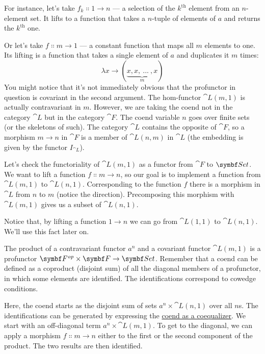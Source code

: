 \noindent
For instance, let's take $f_k \Colon 1 \to n$ --- a
selection of the $k^\text{th}$ element from an $n$-element set. It lifts to
a function that takes a $n$-tuple of elements of $a$ and returns
the $k^\text{th}$ one.

Or let's take $f \Colon m \to 1$ --- a constant
function that maps all $m$ elements to one. Its lifting is a function that
takes a single element of $a$ and duplicates it $m$ times:
\[\lambda{}x \to (\underbrace{x, x,\ ...\ , x}_{m})\]
You might notice that it's not immediately obvious that the profunctor
in question is covariant in the second argument. The hom-functor
$\cat{L}(m, 1)$ is actually contravariant in $m$. However, we
are taking the coend not in the category $\cat{L}$ but in the category
$\cat{F}$. The coend variable $n$ goes over finite sets (or the
skeletons of such). The category $\cat{L}$ contains the opposite of
$\cat{F}$, so a morphism $m \to n$ in $\cat{F}$
is a member of $\cat{L}(n, m)$ in $\cat{L}$ (the embedding is given
by the functor $I_{\cat{L}}$).

Let's check the functoriality of $\cat{L}(m, 1)$ as a functor from
$\cat{F}$ to $\Set$. We want to lift a function
$f \Colon m \to n$, so our goal is to implement a
function from $\cat{L}(m, 1)$ to $\cat{L}(n, 1)$. Corresponding to
the function $f$ there is a morphism in $\cat{L}$ from
$n$ to $m$ (notice the direction). Precomposing this
morphism with $\cat{L}(m, 1)$ gives us a subset of
$\cat{L}(n, 1)$.

\begin{figure}[H]
  \centering
\end{figure}

\noindent
Notice that, by lifting a function $1 \to n$ we can go
from $\cat{L}(1, 1)$ to $\cat{L}(n, 1)$. We'll use this fact later
on.

The product of a contravariant functor $a^n$ and a covariant
functor $\cat{L}(m, 1)$ is a profunctor
$\Fop \times \cat{F} \to \Set$. Remember that a coend can be defined
as a coproduct (disjoint sum) of all the diagonal members of a
profunctor, in which some elements are identified. The identifications
correspond to cowedge conditions.

Here, the coend starts as the disjoint sum of sets
$a^n \times \cat{L}(n, 1)$ over all $n$s. The identifications can
be generated by expressing the
\hyperref[ends-and-coends]{coend as
  a coequalizer}. We start with an off-diagonal term
$a^n \times \cat{L}(m, 1)$. To get to the diagonal, we can apply a
morphism $f \Colon m \to n$ either to the first or
the second component of the product. The two results are then
identified.

